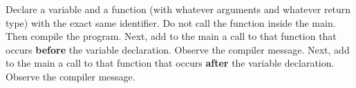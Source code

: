 
 Declare a variable and a function (with whatever arguments and whatever return type) with the exact same identifier.
 Do not call the function inside the main.
 Then compile the program.
 Next, add to the main a call to that function that occurs \textbf{before} the variable declaration. 
 Observe the compiler message.
 Next, add to the main a call to that function that occurs \textbf{after} the variable declaration. 
 Observe the compiler message.
